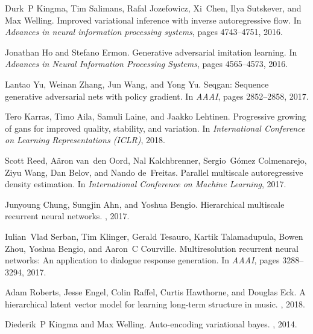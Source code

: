 \documentclass{article}
\begin{document}
\begin{thebibliography}{10}
Durk~P Kingma, Tim Salimans, Rafal Jozefowicz, Xi~Chen, Ilya Sutskever, and Max
  Welling.
\newblock Improved variational inference with inverse autoregressive flow.
\newblock In {\em Advances in neural information processing systems}, pages
  4743--4751, 2016.

Jonathan Ho and Stefano Ermon.
\newblock Generative adversarial imitation learning.
\newblock In {\em Advances in Neural Information Processing Systems}, pages
  4565--4573, 2016.

Lantao Yu, Weinan Zhang, Jun Wang, and Yong Yu.
\newblock Seqgan: Sequence generative adversarial nets with policy gradient.
\newblock In {\em AAAI}, pages 2852--2858, 2017.

Tero Karras, Timo Aila, Samuli Laine, and Jaakko Lehtinen.
\newblock Progressive growing of gans for improved quality, stability, and
  variation.
\newblock In {\em International Conference on Learning Representations (ICLR)},
  2018.

Scott Reed, A{\"a}ron van~den Oord, Nal Kalchbrenner, Sergio~G{\'o}mez
  Colmenarejo, Ziyu Wang, Dan Belov, and Nando de~Freitas.
\newblock Parallel multiscale autoregressive density estimation.
\newblock In {\em International Conference on Machine Learning}, 2017.

Junyoung Chung, Sungjin Ahn, and Yoshua Bengio.
\newblock Hierarchical multiscale recurrent neural networks.
,
  2017.

Iulian~Vlad Serban, Tim Klinger, Gerald Tesauro, Kartik Talamadupula, Bowen
  Zhou, Yoshua Bengio, and Aaron~C Courville.
\newblock Multiresolution recurrent neural networks: An application to dialogue
  response generation.
\newblock In {\em AAAI}, pages 3288--3294, 2017.

Adam Roberts, Jesse Engel, Colin Raffel, Curtis Hawthorne, and Douglas Eck.
\newblock A hierarchical latent vector model for learning long-term structure
  in music.
, 2018.

Diederik~P Kingma and Max Welling.
\newblock Auto-encoding variational bayes.
,
  2014.


\end{thebibliography}
\end{document}
